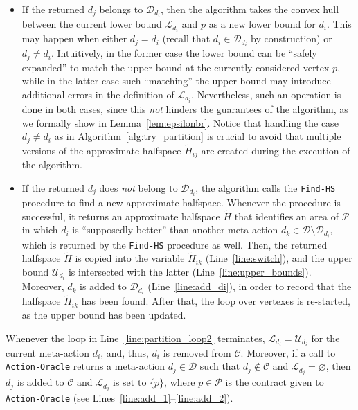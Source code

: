 %
\begin{itemize}[leftmargin=3mm]
	\item If the returned $d_j$ belongs to $\mathcal{D}_{d_i}$, then the algorithm takes the convex hull between the current lower bound $\mathcal{L}_{d_i}$ and $p$ as a new lower bound for $d_i$.
	This may happen when either $d_j = d_i$ (recall that $d_i \in \mathcal{D}_{d_i}$ by construction) or $d_j \neq d_i$.
	Intuitively, in the former case the lower bound can be ``safely expanded'' to match the upper bound at the currently-considered vertex $p$, while in the latter case such ``matching'' the upper bound may introduce additional errors in the definition of $\mathcal{L}_{d_i}$.
	Nevertheless, such an operation is done in both cases, since this \emph{not} hinders the guarantees of the algorithm, as we formally show in Lemma~\ref{lem:epsilonbr}.
	Notice that handling the case $d_j \neq d_i$ as in Algorithm~\ref{alg:try_partition} is crucial to avoid that multiple versions of the approximate halfspace $\widetilde{H}_{ij}$ are created during the execution of the algorithm.
	\item If the returned $d_j$ does \emph{not} belong to $\mathcal{D}_{d_i}$, the algorithm calls the \texttt{Find-HS} procedure to find a new approximate halfspace.
	Whenever the procedure is successful, it returns an approximate halfspace $\widetilde H$ that identifies an area of $\mathcal{P}$ in which $d_i$ is ``supposedly better'' than another meta-action $d_k \in \mathcal{D} \setminus \mathcal{D}_{d_i}$, which is returned by the \texttt{Find-HS} procedure as well.
	Then, the returned halfspace $\widetilde H$ is copied into the variable $\widetilde H_{ik}$ (Line~\ref{line:switch}), and the upper bound $\mathcal{U}_{d_i}$ is intersected with the latter (Line~\ref{line:upper_bounds}).
	Moreover, $d_k$ is added to $\mathcal{D}_{d_i}$ (Line~\ref{line:add_di}), in order to record that the halfspace $\widetilde H_{ik}$ has been found.
	After that, the loop over vertexes is re-started, as the upper bound has been updated. 
\end{itemize}
%
Whenever the loop in Line~\ref{line:partition_loop2} terminates, $\mathcal{L}_{d_i} = \mathcal{U}_{d_i}$ for the current meta-action $d_i$, and, thus, $d_i$ is removed from $\mathcal{C}$.
%
Moreover, if a call to \texttt{Action-Oracle} returns a meta-action $d_j \in \mathcal{D}$ such that $d_j \notin \mathcal{C}$ and $\mathcal{L}_{d_j} = \varnothing$, then $d_j$ is added to $\mathcal{C}$ and $\mathcal{L}_{d_j}$ is set to $\{ p \}$, where $p \in \mathcal{P}$ is the contract given to \texttt{Action-Oracle} (see Lines~\ref{line:add_1}--\ref{line:add_2}).
